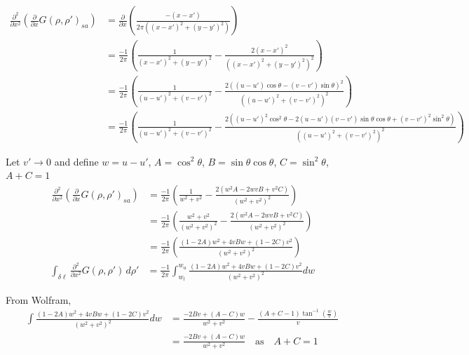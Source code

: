 \documentclass{article}
\newcommand{\0}{\varnothing}
\begin{document}
\begin{align*}
    \frac{\partial^2}{\partial x^2}\left(\frac{\partial}{\partial x} G(\rho, \rho')_{sa}\right) &= \frac{\partial}{\partial x}\left(\frac{-(x-x')}{2\pi((x-x')^2+(y-y')^2)}\right)\\
        &=\frac{-1}{2\pi}\left(\frac{1}{(x-x')^2+(y-y')^2} - \frac{2(x-x')^2}{((x-x')^2+(y-y')^2)^2}\right)\\
    &=\frac{-1}{2\pi}\left(\frac{1}{(u-u')^2+(v-v')^2} - \frac{2((u-u')\cos{\theta} - (v-v')\sin{\theta})^2}{((u-u')^2+(v-v')^2)^2}\right)\\
    &=\frac{-1}{2\pi}\left(\frac{1}{(u-u')^2+(v-v')^2} - \frac{2((u-u')^2\cos^2{\theta} - 2(u-u')(v-v')\sin{\theta}\cos{\theta}+(v-v')^2\sin^2{\theta})}{((u-u')^2+(v-v')^2)^2}\right)
\end{align*}

Let $v' \to 0$ and define $w = u -u'$, $A = \cos^2{\theta}$, $B = \sin{\theta}\cos{\theta}$, $C = \sin^2{\theta}$, $A+C = 1$
\begin{align*}
    \frac{\partial^2}{\partial x^2}\left(\frac{\partial}{\partial x} G(\rho, \rho')_{sa}\right) 
    &=\frac{-1}{2\pi}\left(\frac{1}{w^2+v^2} - \frac{2(w^2 A - 2wv B+v^2 C)}{(w^2+v^2)^2}\right)\\
    &=\frac{-1}{2\pi}\left(\frac{w^2+v^2}{(w^2+v^2)^2} - \frac{2(w^2 A - 2wv B+v^2 C)}{(w^2+v^2)^2}\right)\\
    &=\frac{-1}{2\pi}\left(\frac{(1-2A) w^2 + 4vBw+(1-2C)v^2 }{(w^2+v^2)^2}\right)
\end{align*}
\begin{align*}
    \int_{\delta\ell}\frac{\partial^2}{\partial x^2}G(\rho,\rho')\, d\rho' &= \frac{-1}{2\pi} \int_{w_l}^{w_u}
    \frac{(1-2A) w^2+ 4vBw+(1-2C)v^2 }{(w^2+v^2)^2} dw 
\end{align*}

From Wolfram,
\begin{align*}
    \int \frac{(1-2A) w^2+ 4vBw+(1-2C)v^2 }{(w^2+v^2)^2} dw &= 
    \frac{-2Bv + (A-C) w }{w^2+v^2} - \frac{(A+C-1)\tan^{-1}\left(\frac{w}{v}\right)}{v}  \\
    &= \frac{-2Bv + (A-C) w }{w^2+v^2}  \quad \text{as} \quad A+C = 1
\end{align*}
\end{document}
